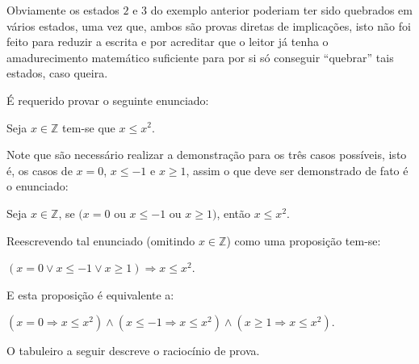 \begin{rema}
	Obviamente os estados $2$ e $3$ do exemplo anterior poderiam ter sido quebrados em vários estados, uma vez que, ambos são provas diretas de implicações, isto não foi feito para reduzir a escrita e por acreditar que o leitor já tenha o amadurecimento matemático suficiente para por si só conseguir ``quebrar'' tais estados, caso queira.
\end{rema}


\begin{exem}\label{exe:ProvaCaso2}
	É requerido provar o seguinte enunciado:
	\begin{center}
		Seja $x \in \mathbb{Z}$ tem-se que $x \leq x^2$.
	\end{center}
	Note que são necessário realizar a demonstração para os três casos possíveis, isto é, os casos de $x = 0$, $x \leq -1$ e $x \geq 1$, assim o que deve ser demonstrado de fato é o enunciado: 
	\begin{center}
		Seja $x \in \mathbb{Z}$, se $(x = 0$ ou $x \leq -1$ ou $x \geq 1)$, então $x \leq x^2$.
	\end{center}
	Reescrevendo tal enunciado (omitindo $x \in \mathbb{Z}$) como uma proposição tem-se:
	\begin{center}
		$(x = 0 \lor x \leq -1 \lor x \geq 1) \Rightarrow x \leq x^2$.
	\end{center}
	E esta proposição é equivalente a:
	\begin{center}
		$(x = 0 \Rightarrow x \leq x^2) \land (x \leq -1 \Rightarrow x \leq x^2)  \land (x \geq 1 \Rightarrow x \leq x^2)$.
	\end{center}
	O tabuleiro a seguir descreve o raciocínio de prova. 
	

\end{exem}

